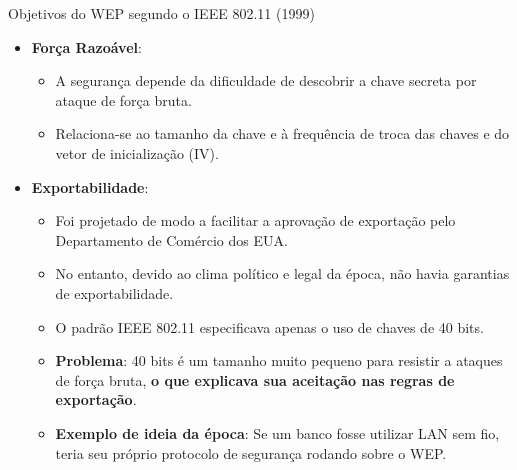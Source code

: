 \begin{frame}{Objetivos do WEP segundo o IEEE 802.11 (1999)}
    \begin{itemize}
        \item \textbf{Força Razoável}:
              \begin{itemize}
                  \item A segurança depende da dificuldade de descobrir a chave secreta por ataque de força bruta.
                  \item Relaciona-se ao tamanho da chave e à frequência de troca das chaves e do vetor de inicialização (IV).
              \end{itemize}

    \end{itemize}

    \begin{itemize}
        \item \textbf{Exportabilidade}:
              \begin{itemize}
                  \item Foi projetado de modo a facilitar a aprovação de exportação pelo Departamento de Comércio dos EUA.
                  \item No entanto, devido ao clima político e legal da época, não havia garantias de exportabilidade.
                  \item O padrão IEEE 802.11 especificava apenas o uso de chaves de 40 bits.
                  \item \textbf{Problema}: 40 bits é um tamanho muito pequeno para resistir a ataques de força bruta, \textbf{o que explicava sua aceitação nas regras de exportação}.
                  \item \textbf{Exemplo de ideia da época}: Se um banco fosse utilizar LAN sem fio, teria seu próprio protocolo de segurança rodando sobre o WEP.
              \end{itemize}

    \end{itemize}


\end{frame}








